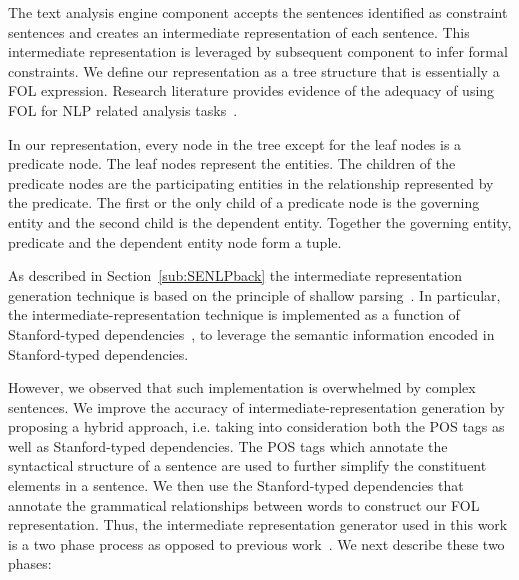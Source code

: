 


The text analysis engine component accepts the sentences identified as constraint sentences and creates an intermediate representation of each sentence.
This intermediate representation is leveraged by subsequent component to infer formal constraints.
We define our representation as a tree structure that is essentially a FOL expression.
Research literature provides evidence of the adequacy of using FOL for NLP related analysis tasks~\cite{Sinha2009,Sinha2010,pandita12:inferring, pandita13:WHYPER}.

In our representation, every node in the tree except for the leaf nodes is a predicate node. 
The leaf nodes represent the entities.
The children of the predicate nodes are the participating entities in the relationship represented by the predicate.
The first or the only child of a predicate node is the governing entity and the second child is the dependent entity.
Together the governing entity, predicate and the dependent entity node form a tuple.  


As described in Section~\ref{sub:SENLPback} the intermediate representation generation technique is based on the principle of shallow parsing~\cite{Branimir2000}. 
In particular, the intermediate-representation technique is implemented as a function of Stanford-typed dependencies~\cite{Marneffe06LREC,Marneffe08COLING,KleinNIPS03}, to leverage the semantic information encoded in Stanford-typed dependencies.


However, we observed that such implementation is overwhelmed by complex sentences.
We improve the accuracy of intermediate-representation generation by proposing a hybrid approach, i.e. taking into consideration both the POS tags as well as Stanford-typed dependencies.
The POS tags which annotate the syntactical structure of a sentence are used to further simplify the constituent elements in a sentence. 
We then use the Stanford-typed dependencies that annotate the grammatical relationships between words to construct our FOL representation.
Thus, the intermediate representation generator used in this work is a two phase process as opposed to previous work~\cite{pandita12:inferring, pandita13:WHYPER}. 
We next describe these two phases:

